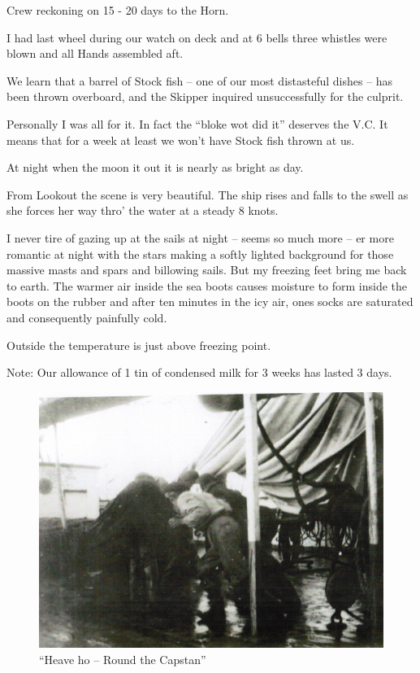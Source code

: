 \documentclass[
  11pt,
  msmallroyalvopaper
]{memoir}
\begin{document}
Crew reckoning on 15 - 20 days to the Horn.

I had last wheel during our watch on deck and at 6 bells three whistles
were blown and all Hands assembled aft.

We learn that a barrel of Stock fish -- one of our most distasteful
dishes -- has been thrown overboard, and the Skipper inquired
unsuccessfully for the culprit.

Personally I was all for it. In fact the ``bloke wot did it'' deserves
the V.C. It means that for a week at least we won't have Stock fish
thrown at us.

At night when the moon it out it is nearly as bright as day.

From Lookout the scene is very beautiful. The ship rises and falls to
the swell as she forces her way thro' the water at a steady 8 knots.

I never tire of gazing up at the sails at night -- seems so much more --
er more romantic at night with the stars making a softly lighted
background for those massive masts and spars and billowing sails. But my
freezing feet bring me back to earth. The warmer air inside the sea
boots causes moisture to form inside the boots on the rubber and after
ten minutes in the icy air, ones socks are saturated and consequently
painfully cold.

Outside the temperature is just above freezing point.

Note: Our allowance of 1 tin of condensed milk for 3 weeks has lasted 3
days.

\begin{figure}
\centering
\includegraphics{./images/image008.png}
\caption{``Heave ho -- Round the Capstan''}
\end{figure}
\end{document}
